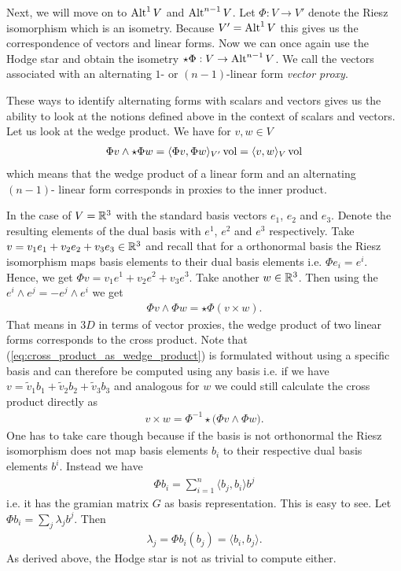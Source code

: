 \documentclass[../main.tex]{subfiles}
\begin{document}
Next, we will move on to ${\text{Alt}^{1}\,V}$ and ${\text{Alt}^{n-1}\,V}$. 
Let $\Phi: V \rightarrow V'$ denote the Riesz isomorphism which is an isometry.
Because $V' = {\text{Alt}^{1}\,V}$ this gives us the correspondence of 
vectors and linear forms. Now we can once again use the Hodge star and obtain 
the isometry $\star \Phi: V \rightarrow {\text{Alt}^{n-1}\,V}$. We call 
the vectors associated with an alternating $1$- or $(n-1)$-linear form 
\textit{vector proxy}.

These ways to identify alternating forms with scalars and vectors gives us the 
ability to look at the notions defined above in the context of scalars 
and vectors.
Let us look at the wedge product. We have for $v,w \in V$
\begin{align*}
    \Phi v \wedge \star \Phi w = \langle \Phi v , \Phi w \rangle_{V'} \operatorname{vol}
    = \langle v , w \rangle_{V} \operatorname{vol}
\end{align*}
which means that the wedge product of a linear form and an alternating $(n-1)$-
linear form corresponds in proxies to the inner product.

In the case of $V= \mathbb{R}^3$ with the standard basis
vectors $e_1$, $e_2$ and $e_3$. Denote the resulting elements 
of the dual basis with $e^1$, $e^2$ and $e^3$ respectively. 
Take $v = v_1 e_1 + v_2 e_2 + v_3 e_3 \in \mathbb{R}^3$ 
and recall that for a orthonormal basis the Riesz isomorphism maps basis 
elements to their dual basis elements i.e. $\Phi e_i = e^i$. Hence, 
we get $\Phi v = v_1 e^1 + v_2 e^2 + v_3 e^3$. Take another $w \in \mathbb{R}^3$.
Then using the $e^i \wedge e^j = - e^j \wedge e^i$ we get 
\begin{align}
    \Phi v \wedge \Phi w = \star \Phi (v \times w). 
    \label{eq:cross_product_as_wedge_product}
\end{align}
That means in $3D$ in terms of vector proxies, the wedge product 
of two linear forms corresponds to the cross product. Note that 
(\ref{eq:cross_product_as_wedge_product}) is formulated without using a 
specific basis and can therefore be computed using any basis i.e. 
if we have $v = \tilde{v}_1 b_1 + \tilde{v}_2 b_2 + \tilde{v}_3 b_3$ 
and analogous for $w$ we could still calculate the cross product directly as 
\begin{align*}
    v \times w = \Phi^{-1} \star \big(\Phi v \wedge \Phi w \big).
\end{align*}
One has to take care though because if the basis is not orthonormal 
the Riesz isomorphism does not map basis elements $b_i$ to their respective 
dual basis elements $b^i$. Instead we have 
\begin{align*}
    \Phi b_i = \sum_{i=1}^{n} \langle b_j, b_i \rangle b^j
\end{align*}
i.e. it has the gramian matrix $G$ as basis representation. 
This is easy to 
see. Let $\Phi b_i = \sum_j \lambda_j b^j$. Then
\begin{align*}
    \lambda_j = \Phi b_i (b_j) = \langle b_i, b_j \rangle.
\end{align*}
As derived above, the Hodge star is not as trivial to compute either.
\end{document}
